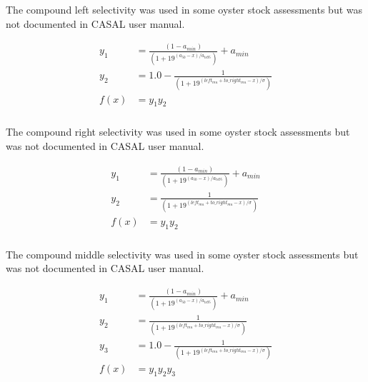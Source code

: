\subsubsection[Compound-Left]{}\label{sec:Selectivity-CompoundLeft}

The compound left selectivity was used in some oyster stock assessments but was not documented in CASAL user manual.

\begin{align*}
y_1 & = \frac{\left(1 - a_{min}\right)}{\left(1 + 19^{(a_{50} - x)/a_{to95}}\right)}  + a_{min}\\
y_2 & = 1.0 - \frac{1}{\left(1 + 19^{(left_{mu} + to\_right_{mu} - x)/\sigma}\right)}\\
f(x)  &= 	y_1 y_2
\end{align*}


\subsubsection[Compound-Right]{}\label{sec:Selectivity-CompoundRight}

The compound right selectivity was used in some oyster stock assessments but was not documented in CASAL user manual.

\begin{align*}
y_1 & = \frac{\left(1 - a_{min}\right)}{\left(1 + 19^{(a_{50} - x)/a_{to95}}\right)}  + a_{min}\\
y_2 & = \frac{1}{\left(1 + 19^{(left_{mu} + to\_right_{mu} - x)/\sigma}\right)}\\
f(x)  &= 	y_1 y_2
\end{align*}

\subsubsection[Compound-Middle]{}\label{sec:Selectivity-CompoundMidde}

The compound middle selectivity was used in some oyster stock assessments but was not documented in CASAL user manual.

\begin{align*}
y_1 & = \frac{\left(1 - a_{min}\right)}{\left(1 + 19^{(a_{50} - x)/a_{to95}}\right)}  + a_{min}\\
y_2 & = \frac{1}{\left(1 + 19^{(left_{mu} + to\_right_{mu} - x)/\sigma}\right)}\\
y_3 & = 1.0 -  \frac{1}{\left(1 + 19^{(left_{mu} + to\_right_{mu} - x)/\sigma}\right)}\\
f(x)  &= 	y_1 y_2 y_3
\end{align*}

